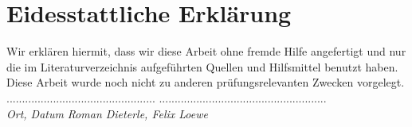 \documentclass[a4paper,ngerman,oneside,titlepage,bibliography=totoc,11pt]{scrreprt}
\begin{document}







 





\chapter*{Eidesstattliche Erklärung}

Wir erklären hiermit, dass wir diese Arbeit ohne fremde Hilfe angefertigt und nur die im Literaturverzeichnis aufgeführten Quellen und Hilfsmittel benutzt haben. Diese Arbeit wurde noch nicht zu anderen prüfungsrelevanten Zwecken vorgelegt.\\[1.5cm]

\noindent ................................................
\qquad\qquad\qquad\qquad\qquad
......................................................\\[0.5mm]
\textit{Ort, Datum}
\qquad\qquad\qquad\qquad\qquad\qquad\qquad\qquad\qquad
\textit{Roman Dieterle, Felix Loewe}
\end{document}
